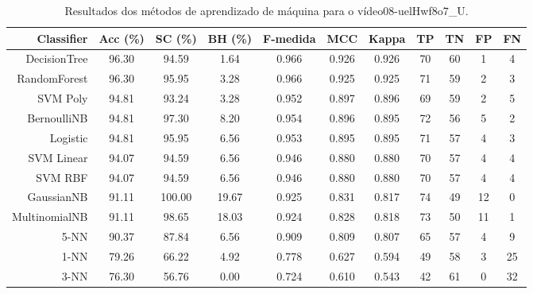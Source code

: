 \begin{table}[!htb]
\centering
\caption{Resultados dos métodos de aprendizado de máquina para o vídeo08-uelHwf8o7_U.}
\label{tab:08-uelHwf8o7_U}
\begin{tabular}{r|c|c|c|c|c|c|c|c|c|c}
\hline\hline
Classifier & Acc (\%) & SC (\%) & BH (\%) & F-medida & MCC & Kappa & TP & TN & FP & FN \\ \hline
DecisionTree & 96.30 & 94.59 & 1.64 & 0.966 & 0.926 & 0.926 & 70 & 60 & 1 & 4 \\ 
RandomForest & 96.30 & 95.95 & 3.28 & 0.966 & 0.925 & 0.925 & 71 & 59 & 2 & 3 \\ 
SVM Poly & 94.81 & 93.24 & 3.28 & 0.952 & 0.897 & 0.896 & 69 & 59 & 2 & 5 \\ 
BernoulliNB & 94.81 & 97.30 & 8.20 & 0.954 & 0.896 & 0.895 & 72 & 56 & 5 & 2 \\ 
Logistic & 94.81 & 95.95 & 6.56 & 0.953 & 0.895 & 0.895 & 71 & 57 & 4 & 3 \\ 
SVM Linear & 94.07 & 94.59 & 6.56 & 0.946 & 0.880 & 0.880 & 70 & 57 & 4 & 4 \\ 
SVM RBF & 94.07 & 94.59 & 6.56 & 0.946 & 0.880 & 0.880 & 70 & 57 & 4 & 4 \\ 
GaussianNB & 91.11 & 100.00 & 19.67 & 0.925 & 0.831 & 0.817 & 74 & 49 & 12 & 0 \\ 
MultinomialNB & 91.11 & 98.65 & 18.03 & 0.924 & 0.828 & 0.818 & 73 & 50 & 11 & 1 \\ 
5-NN & 90.37 & 87.84 & 6.56 & 0.909 & 0.809 & 0.807 & 65 & 57 & 4 & 9 \\ 
1-NN & 79.26 & 66.22 & 4.92 & 0.778 & 0.627 & 0.594 & 49 & 58 & 3 & 25 \\ 
3-NN & 76.30 & 56.76 & 0.00 & 0.724 & 0.610 & 0.543 & 42 & 61 & 0 & 32 \\ 
\hline\hline
\end{tabular}
\end{table}

